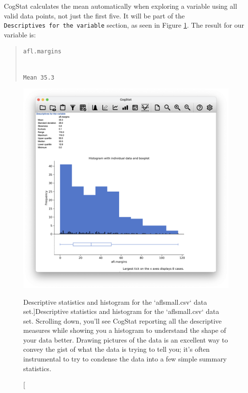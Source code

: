 \documentclass[
  11pt,
  a4paper,
  twoside,symmetric,openright]{book}
\theoremstyle{break}
\theoremstyle{break}
\begin{document}
CogStat calculates the mean automatically when exploring a variable using all valid data points, not just the first five. It will be part of the \texttt{Descriptives\ for\ the\ variable} section, as seen in Figure \ref{fig:histogramaflsmall}. The result for our variable is:

\begin{quote}
\texttt{afl.margins}\strut \\
\texttt{Mean\ 35.3}
\end{quote}

\begin{figure}

{\centering \includegraphics[width=0.6\linewidth]{resources/image/cogstathistogramaflsmall} 

}

\caption[Descriptive statistics and histogram for the `aflsmall.csv` data set.]{Descriptive statistics and histogram for the `aflsmall.csv` data set. Scrolling down, you'll see CogStat reporting all the descriptive measures while showing you a histogram to understand the shape of your data better. Drawing pictures of the data is an excellent way to convey the gist of what the data is trying to tell you; it's often instrumental to try to condense the data into a few simple summary statistics.}\label{fig:histogramaflsmall}
\end{figure}
\end{document}

